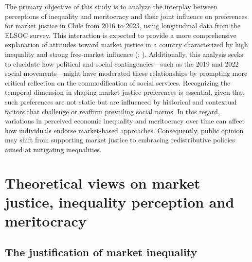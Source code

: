 \documentclass[
  12pt,
]{article}
\begin{document}
The primary objective of this study is to analyze the interplay between
perceptions of inequality and meritocracy and their joint influence on
preferences for market justice in Chile from 2016 to 2023, using
longitudinal data from the ELSOC survey. This interaction is expected to
provide a more comprehensive explanation of attitudes toward market
justice in a country characterized by high inequality and strong
free-market influence (;
). Additionally, this
analysis seeks to elucidate how political and social
contingencies---such as the 2019 and 2022 social movements---might have
moderated these relationships by prompting more critical reflection on
the commodification of social services. Recognizing the temporal
dimension in shaping market justice preferences is essential, given that
such preferences are not static but are influenced by historical and
contextual factors that challenge or reaffirm prevailing social norms.
In this regard, variations in perceived economic inequality and
meritocracy over time can affect how individuals endorse market-based
approaches. Consequently, public opinion may shift from supporting
market justice to embracing redistributive policies aimed at mitigating
inequalities.

\section{Theoretical views on market justice, inequality perception and
meritocracy}\label{theoretical-views-on-market-justice-inequality-perception-and-meritocracy}

\subsection{The justification of market
inequality}\label{the-justification-of-market-inequality}
\end{document}
